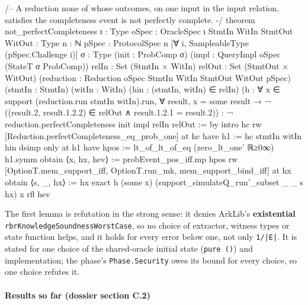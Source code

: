 \begin{leancode}
/-- A reduction none of whose outcomes, on one input in the input relation, satisfies the
completeness event is not perfectly complete. -/
theorem not_perfectCompleteness {ι : Type} {oSpec : OracleSpec ι}
    {StmtIn WitIn StmtOut WitOut : Type} {n : ℕ} {pSpec : ProtocolSpec n}
    [∀ i, SampleableType (pSpec.Challenge i)]
    {σ : Type} (init : ProbComp σ) (impl : QueryImpl oSpec (StateT σ ProbComp))
    {relIn : Set (StmtIn × WitIn)} {relOut : Set (StmtOut × WitOut)}
    (reduction : Reduction oSpec StmtIn WitIn StmtOut WitOut pSpec)
    (stmtIn : StmtIn) (witIn : WitIn) (hin : (stmtIn, witIn) ∈ relIn)
    (h : ∀ x ∈ support (reduction.run stmtIn witIn).run, ∀ result, x = some result →
      ¬ ((result.2, result.1.2.2) ∈ relOut ∧ result.1.2.1 = result.2)) :
    ¬ reduction.perfectCompleteness init impl relIn relOut := by
  intro hc
  rw [Reduction.perfectCompleteness_eq_prob_one] at hc
  have h1 := hc stmtIn witIn hin
  dsimp only at h1
  have hpos := lt_of_lt_of_eq (zero_lt_one' ℝ≥0∞) h1.symm
  obtain ⟨x, hx, hev⟩ := probEvent_pos_iff.mp hpos
  rw [OptionT.mem_support_iff, OptionT.run_mk, mem_support_bind_iff] at hx
  obtain ⟨s, _, hx⟩ := hx
  exact h (some x) (support_simulateQ_run'_subset _ _ s hx) x rfl hev
\end{leancode}

The first lemma is refutation in the strong sense: it denies ArkLib's \textbf{existential} \texttt{r\allowbreak{}b\allowbreak{}r\allowbreak{}K\allowbreak{}n\allowbreak{}o\allowbreak{}w\allowbreak{}l\allowbreak{}e\allowbreak{}d\allowbreak{}g\allowbreak{}e\allowbreak{}S\allowbreak{}o\allowbreak{}u\allowbreak{}n\allowbreak{}d\allowbreak{}n\allowbreak{}e\allowbreak{}s\allowbreak{}s\allowbreak{}W\allowbreak{}o\allowbreak{}r\allowbreak{}s\allowbreak{}t\allowbreak{}C\allowbreak{}a\allowbreak{}s\allowbreak{}e}, so no choice of extractor, witness types or state function helps, and it holds for every error below one, not only \texttt{1/\allowbreak{}|E|}. It is stated for one choice of the shared-oracle initial state (\texttt{pure (\allowbreak{})}) and implementation; the phase's \texttt{Phase.\allowbreak{}Security} owes its bound for every choice, so one choice refutes it.

\paragraph{Results so far (dossier section C.2)}\label{sec:gen-pubinput-C2}

